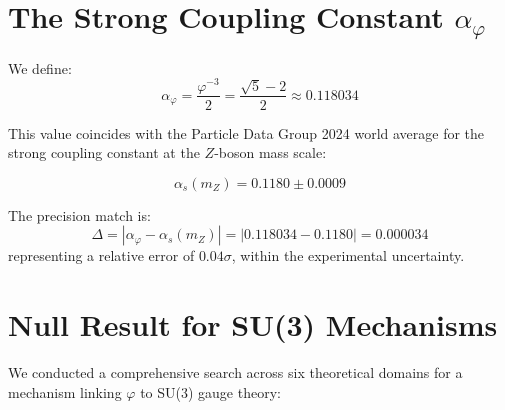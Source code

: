 \documentclass{article}
\begin{document}
\medskip

\section*{The Strong Coupling Constant $\alpha_\varphi$}

We define:
\begin{equation}
  \alpha_\varphi = \frac{\varphi^{-3}}{2}
  = \frac{\sqrt{5} - 2}{2}
  \approx 0.118034
  \label{eq:alphaphi}
\end{equation}

This value coincides with the Particle Data Group 2024 world average for the
strong coupling constant at the $Z$-boson mass scale:

\begin{equation}
  \alpha_s(m_Z) = 0.1180 \pm 0.0009
\end{equation}

The precision match is:
\begin{equation}
  \Delta = |\alpha_\varphi - \alpha_s(m_Z)| = |0.118034 - 0.1180| = 0.000034
  \label{eq:delta}
\end{equation}
representing a relative error of $0.04\sigma$, within the experimental uncertainty.

\medskip

\section*{Null Result for SU(3) Mechanisms}

We conducted a comprehensive search across six theoretical domains for a mechanism linking $\varphi$ to
SU(3) gauge theory:

\end{document}
